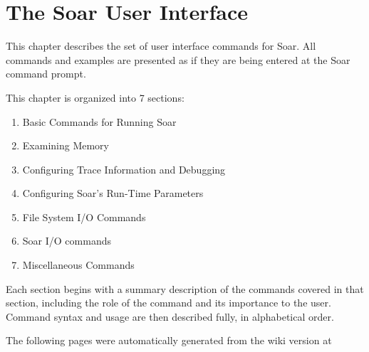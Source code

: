 \chapter{The Soar User Interface}
\label{INTERFACE}




This chapter describes the set of user interface commands for Soar. All commands and examples are presented as 
if they are being entered at the Soar command prompt.

This chapter is organized into 7 sections:
\begin{enumerate}
\item Basic Commands for Running Soar
\item Examining Memory
\item Configuring Trace Information and Debugging
\item Configuring Soar's Run-Time Parameters
\item File System I/O Commands
\item Soar I/O commands
\item Miscellaneous Commands
\end{enumerate}

Each section begins with a summary description of the commands covered
in that section, including the role of the command and its importance
to the user.  Command syntax and usage are then described fully, in
alphabetical order.

The following pages were automatically generated from the wiki version
at

